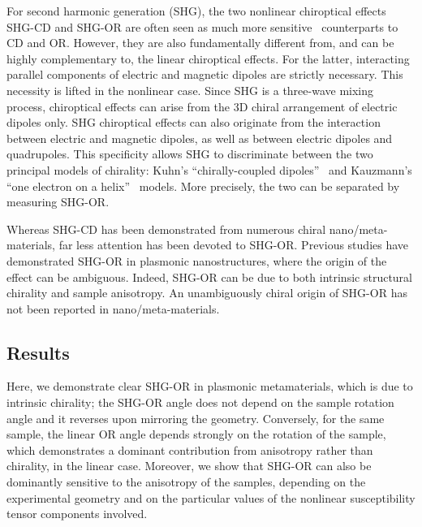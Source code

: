 For second harmonic generation (SHG), the two nonlinear chiroptical effects SHG-CD and SHG-OR are often seen as much more sensitive~\cite{Petralli-Mallow1993} counterparts to CD and OR. However, they are also fundamentally different from, and can be highly complementary to, the linear chiroptical effects. For the latter, interacting parallel components of electric and magnetic dipoles are strictly necessary. This necessity is lifted in the nonlinear case. Since SHG is a three-wave mixing process, chiroptical effects can arise from the 3D chiral arrangement of electric dipoles only.\cite{verbiest2009second} 
SHG chiroptical effects can also originate from the interaction between electric and magnetic dipoles, as well as between electric dipoles and quadrupoles. This specificity allows SHG to discriminate between the two principal models of chirality:\cite{Fischer2005a} Kuhn's ``chirally-coupled dipoles''~\cite{Kuhn1930} and Kauzmann's ``one electron on a helix''~\cite{Kauzmann1957a} models. More precisely, the two can be separated by measuring SHG-OR. 

Whereas SHG-CD has been demonstrated from numerous chiral nano/meta-materials,\cite{Hooper2017, Mamonov2017, Chen2016, Kolkowski2015, Belardini2014} far less attention has been devoted to SHG-OR. Previous studies have demonstrated SHG-OR in plasmonic nanostructures, where the origin of the effect can be ambiguous.\cite{Romain2017, Ren2012a, Mamonov2012} Indeed, SHG-OR can be due to both intrinsic structural chirality and sample anisotropy. An unambiguously chiral origin of SHG-OR has not been reported in nano/meta-materials. 

\subsection{Results}\label{sec:results:OAinPlanarNanohelices:results}
Here, we demonstrate clear SHG-OR in plasmonic metamaterials, which is due to intrinsic chirality; the SHG-OR angle does not depend on the sample rotation angle and it reverses upon mirroring the geometry. Conversely, for the same sample, the linear OR angle depends strongly on the rotation of the sample, which demonstrates a dominant contribution from anisotropy rather than chirality, in the linear case. Moreover, we show that SHG-OR can also be dominantly sensitive to the anisotropy of the samples, depending on the experimental geometry and on the particular values of the nonlinear susceptibility tensor components involved. 


